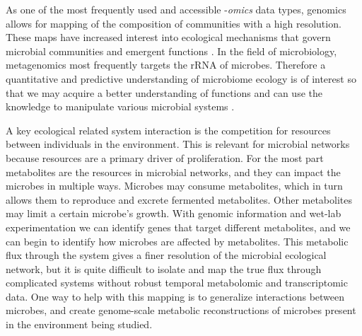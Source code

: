 As one of the most frequently used and accessible -\textit{omics} data types, genomics allows for mapping of the composition of communities with a high resolution. These maps have increased interest into ecological mechanisms that govern microbial communities and emergent functions \citep{Costello2012}. In the field of microbiology, metagenomics most frequently targets the \acrshort{rRNA} of microbes. Therefore a quantitative and predictive understanding of microbiome ecology is of interest so that we may acquire a better understanding of functions and can use the knowledge to manipulate various microbial systems \citep{Goldford2018}. 

A key ecological related system interaction is the competition for resources between individuals in the environment. This is relevant for microbial networks because resources are a primary driver of proliferation. For the most part metabolites are the resources in microbial networks, and they can impact the microbes in multiple ways. Microbes may consume metabolites, which in turn allows them to reproduce and excrete fermented metabolites. Other metabolites may limit a certain microbe's growth. With genomic information and wet-lab experimentation we can identify genes that target different metabolites, and we can begin to identify how microbes are affected by metabolites. This metabolic flux through the system gives a finer resolution of the microbial ecological network, but it is quite difficult to isolate and map the true flux through complicated systems without robust temporal metabolomic and transcriptomic data. One way to help with this mapping is to generalize interactions between microbes, and create genome-scale metabolic reconstructions of microbes present in the environment being studied. 

